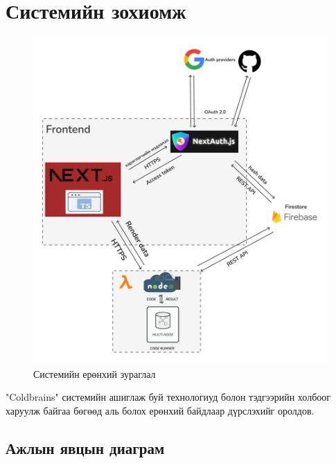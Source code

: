 \chapter{Системийн зохиомж}

\begin{figure}[h]
  \centering
  \includegraphics{img/diagrams/architecture.PNG}
  \caption{Системийн ерөнхий зураглал}
\end{figure}

"Coldbrains" системийн ашиглаж буй технологиуд болон тэдгээрийн холбоог харуулж байгаа бөгөөд аль болох ерөнхий байдлаар дүрслэхийг оролдов.

\clearpage

\section{Ажлын явцын диаграм}

